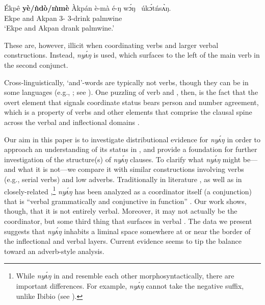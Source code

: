\documentclass[output=paper,modfonts,nonflat,
hidelinks
]{langsci/langscibook}
\begin{document}
\ea\label{ex:duncan-et-al:2}
\gll \'{E}kpê \textbf{y\`{e}/ǹd\`{o}/\`{m}m\`{e}} \`{A}kpán \`{e}-mà é-ŋ w\'ɔŋ~ úk\'ɔtńs\`{ʌ}ŋ. \\
Ekpe and Akpan 3{\PL}-{\PST} 3{\PL}-drink palmwine \\
\glt ‘Ekpe and Akpan drank palmwine.’
\z

\noindent These are, however, illicit when coordinating verbs and larger verbal constructions. Instead, \textit{ny\'{ʌ}ŋ} is used, which surfaces to the left of the main verb in the second conjunct.

\ea\label{ex:duncan-et-al:3}
\z
\z

\noindent Cross-linguistically, `and'-words are typically not verbs, though they can be in some languages (e.g., ; see \citealt{brown2008verbs}). One puzzling  of  verb and , then, is the fact that the overt element that signals coordinate status bears person and number agreement, which is a property of verbs and other elements that comprise the clausal spine across the verbal and inflectional domains \citep{baker2010agreement}.

Our aim in this paper is to investigate distributional evidence for \textit{ny\'{ʌ}ŋ} in order to approach an understanding of its status in , and provide a foundation for further investigation of the structure(s) of \textit{ny\'{ʌ}ŋ} clauses. To clarify what \textit{ny\'{ʌ}ŋ} might be---and what it is not---we compare it with similar constructions involving verbs (e.g., serial verbs) and low adverbs. Traditionally in  literature \citep{essien1985negation,essien1990grammar}, as well as in closely-related  \citep{goldie1857principles,welmers1968efik,welmers1973african},\footnote{While \textit{ny\'{ʌ}ŋ} in  and  resemble each other morphosyntactically, there are important differences. For example,  \textit{ny\'{ʌ}ŋ} cannot take the negative suffix, unlike Ibibio (see ).} \textit{ny\'{ʌ}ŋ} has been analyzed as a coordinator itself (a conjunction) that is ``verbal grammatically and conjunctive in function'' \citep[148]{essien1990grammar}. Our work shows, though, that it is not entirely verbal. Moreover, it may not actually be the coordinator, but some third thing that surfaces in verbal . The data we present suggests that \textit{ny\'{ʌ}ŋ} inhabits a liminal space somewhere at or near the border of the inflectional and verbal layers. Current evidence seems to tip the balance toward an adverb-style analysis.
\end{document}
